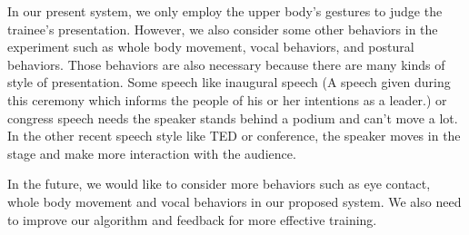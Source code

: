 \par In our present system, we only employ the upper body's gestures to judge the trainee's presentation. However, we also consider some other behaviors in the experiment such as whole body movement, vocal behaviors, and postural behaviors. Those behaviors are also necessary because there are many kinds of style of presentation. Some speech like inaugural speech (A speech given during this ceremony which informs the people of his or her intentions as a leader.) or congress speech needs the speaker stands behind a podium and can't move a lot. In the other recent speech style like TED or conference, the speaker moves in the stage and make more interaction with the audience. 
\par In the future, we would like to consider more behaviors such as eye contact, whole body movement and vocal behaviors in our proposed system. We also need to improve our algorithm and feedback for more effective training. 

